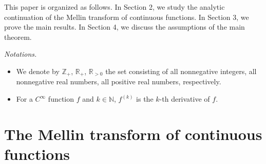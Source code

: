 \documentclass[12pt]{amsart}
\numberwithin{equation}{section}
\theoremstyle{definition}
\theoremstyle{remark}
\newcommand{\R}{{\mathbb R}}
\newcommand{\C}{{\mathbb C}}
\newcommand{\N}{{\mathbb N}}
\newcommand{\Z}{{\mathbb Z}}
\newcommand{\1}{{\bf 1}}
\begin{document}
This paper is organized as follows.
In Section 2, 
we study the analytic continuation 
of the Mellin transform of continuous functions.
In Section 3, 
we prove the main results.
In Section 4, 
we discuss the assumptions of the main theorem.

\medskip

{\it Notations.}
\begin{itemize}
\item 
We denote by $\Z_+$, $\R_+$, $\R_{>0}$
the set consisting of all nonnegative integers, 
all nonnegative real numbers, all positive real numbers,  
respectively. 
\item For a $C^{\infty}$ function $f$ and $k\in\N$, 
$f^{(k)}$ is the $k$-th derivative of $f$.
\end{itemize}



\section{The Mellin transform of continuous functions}
\end{document}
